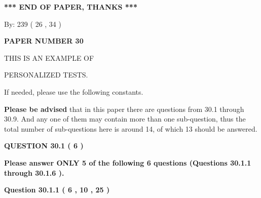 \documentclass[12pt]{article}
\begin{document}
   
   
   
   
\vspace{1.0in} 
{\textbf{\large{ *** END OF PAPER, THANKS *** }}} 
   
   
\hspace{1.0in} By: 
         239 (          26 ,           34 )
   
   
   
   
\newpage 
\setcounter{page}{ 
    30001 } 
   
   
   
   
 {\textbf{ \Large{ PAPER NUMBER           30  }}}
   
   
\vspace{0.2in}
   
   
   
   
   
   
 \vspace{0.2in}
 
 
{\Huge  THIS IS AN EXAMPLE OF}
 
{\Huge  PERSONALIZED TESTS. }
 
If needed, please use the following constants.
 
 
 
{\textbf{\large{Please be advised}}} that in this paper there are questions from
30.1 through
30.9.
And any one of them may contain more than one sub-question, thus the total number
of sub-questions here is around 14, of which
13 should be answered.
 
\vspace{0.3in}
 
 
   
   
  
\vspace{0.2in}
  
{\textbf{\Large{QUESTION
30.1 
 (           6 )
}}}
  
  
{\textbf{\Large{Please answer ONLY  %
           5  %
 of the following  %
           6  %
 questions (Questions  %
30.1.1 %
 through  %
30.1.6 %
 ). }}}
   
   
  
\vspace{0.2in}
  
{\textbf{\Large{Question
30.1.1 
 (           6 ,          10 ,          25 )
}}}
  
  
  
\end{document}
